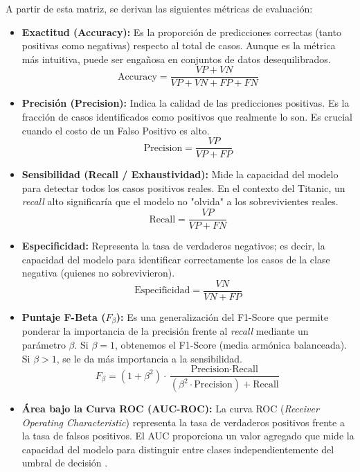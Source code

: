 \documentclass[12pt]{article}
\begin{document}
A partir de esta matriz, se derivan las siguientes métricas de evaluación:

\begin{itemize}
    \item \textbf{Exactitud (Accuracy):} Es la proporción de predicciones correctas (tanto positivas como negativas) respecto al total de casos. Aunque es la métrica más intuitiva, puede ser engañosa en conjuntos de datos desequilibrados.
    \[ \text{Accuracy} = \frac{VP + VN}{VP + VN + FP + FN} \]

    \item \textbf{Precisión (Precision):} Indica la calidad de las predicciones positivas. Es la fracción de casos identificados como positivos que realmente lo son. Es crucial cuando el costo de un Falso Positivo es alto.
    \[ \text{Precision} = \frac{VP}{VP + FP} \]

    \item \textbf{Sensibilidad (Recall / Exhaustividad):} Mide la capacidad del modelo para detectar todos los casos positivos reales. En el contexto del Titanic, un \textit{recall} alto significaría que el modelo no "olvida" a los sobrevivientes reales.
    \[ \text{Recall} = \frac{VP}{VP + FN} \]

    \item \textbf{Especificidad:} Representa la tasa de verdaderos negativos; es decir, la capacidad del modelo para identificar correctamente los casos de la clase negativa (quienes no sobrevivieron).
    \[ \text{Especificidad} = \frac{VN}{VN + FP} \]

    \item \textbf{Puntaje F-Beta ($F_\beta$):} Es una generalización del F1-Score que permite ponderar la importancia de la precisión frente al \textit{recall} mediante un parámetro $\beta$. Si $\beta = 1$, obtenemos el F1-Score (media armónica balanceada). Si $\beta > 1$, se le da más importancia a la sensibilidad.
    \[ F_\beta = (1 + \beta^2) \cdot \frac{\text{Precision} \cdot \text{Recall}}{(\beta^2 \cdot \text{Precision}) + \text{Recall}} \]

    \item \textbf{Área bajo la Curva ROC (AUC-ROC):} La curva ROC (\textit{Receiver Operating Characteristic}) representa la tasa de verdaderos positivos frente a la tasa de falsos positivos. El AUC proporciona un valor agregado que mide la capacidad del modelo para distinguir entre clases independientemente del umbral de decisión \cite{hastie2009elements}.
\end{itemize}
\end{document}
